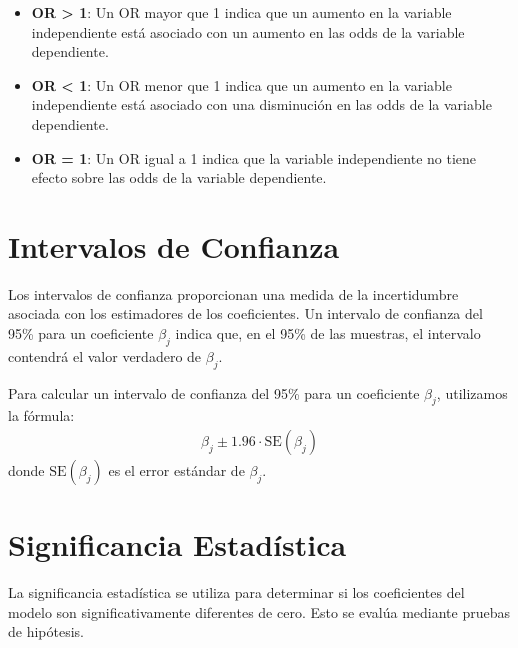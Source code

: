 \documentclass[a4paper]{report} %
\begin{document}
\begin{itemize}
    \item \textbf{OR > 1}: Un OR mayor que 1 indica que un aumento en la variable independiente est\'a asociado con un aumento en las odds de la variable dependiente.
    \item \textbf{OR < 1}: Un OR menor que 1 indica que un aumento en la variable independiente est\'a asociado con una disminuci\'on en las odds de la variable dependiente.
    \item \textbf{OR = 1}: Un OR igual a 1 indica que la variable independiente no tiene efecto sobre las odds de la variable dependiente.
\end{itemize}

\section{Intervalos de Confianza}

Los intervalos de confianza proporcionan una medida de la incertidumbre asociada con los estimadores de los coeficientes. Un intervalo de confianza del 95\% para un coeficiente $\beta_j$ indica que, en el 95\% de las muestras, el intervalo contendr\'a el valor verdadero de $\beta_j$.


Para calcular un intervalo de confianza del 95\% para un coeficiente $\beta_j$, utilizamos la f\'ormula:
\begin{eqnarray*}
\beta_j \pm 1.96 \cdot \text{SE}(\beta_j)
\end{eqnarray*}
donde $\text{SE}(\beta_j)$ es el error est\'andar de $\beta_j$.

\section{Significancia Estad\'istica}

La significancia estad\'istica se utiliza para determinar si los coeficientes del modelo son significativamente diferentes de cero. Esto se eval\'ua mediante pruebas de hip\'otesis.

\end{document}
